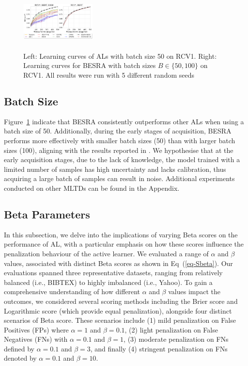 \documentclass[letterpaper]{article} %
\begin{document}
\begin{figure}[!ht]
\centering
\includegraphics[width=0.33840000000000003\textwidth,height=1.19in ]{figures/batchsize_mircof1_2_v1.png}
\caption{
Left: Learning curves of ALs with batch size 50 on RCV1. Right: Learning curves for BESRA with batch sizes $B \in  \{50, 100\}$ on RCV1. All results were run with 5 different random seeds}
\label{fig:batchsize_mircof1_2}
\end{figure}

\vspace{-3.34mm}
\subsection{Batch Size}
Figure~\ref{fig:batchsize_mircof1_2} indicate that BESRA consistently outperforms other ALs when using a batch size of 50.
Additionally, during the early stages of acquisition, BESRA performs more effectively with smaller batch sizes (50) than with larger batch sizes (100), aligning with the results reported in \cite{TanDuBun-IEEEPAMI23, NEURIPS2019_95323660}.
We hypothesise that at the early acquisition stages, due to the lack of knowledge, the model trained with a limited number of samples has high uncertainty and lacks calibration, thus acquiring a large batch of samples can result in noise. Additional experiments conducted on other MLTDs can be found in the Appendix.


\vspace{-1.52mm}
\subsection{Beta Parameters}

In this subsection, we delve into the implications of varying Beta scores on the performance of AL, with a particular emphasis on how these scores influence the penalization behaviour of the active learner.
We evaluated a range of $\alpha$ and $\beta$ values, associated with distinct Beta scores as shown in Eq~(\ref{eq-Sbeta}).
Our evaluations spanned three representative datasets, ranging from relatively balanced (i.e., BIBTEX) to highly imbalanced (i.e., Yahoo). To gain a comprehensive understanding of how different $\alpha$ and $\beta$ values impact the outcomes, we considered several scoring methods including the Brier score and Logarithmic score (which provide equal penalization), alongside four distinct scenarios of Beta score. These scenarios include (1) mild penalization on False Positives (FPs) where $\alpha=1$ and $\beta=0.1$, (2) light penalization on False Negatives (FNs) with $\alpha=0.1$ and $\beta=1$, (3) moderate penalization on FNs defined by $\alpha=0.1$ and $\beta=3$, and finally (4) stringent penalization on FNs denoted by $\alpha=0.1$ and $\beta=10$.
\end{document}

